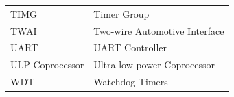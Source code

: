 \begin{longtable}[c]{ R{3cm} p{12cm} }
TIMG & Timer Group \\
TWAI    & Two-wire Automotive Interface \\
UART & UART Controller \\
ULP Coprocessor & Ultra-low-power Coprocessor \\
WDT & Watchdog Timers \\


\end{longtable}



